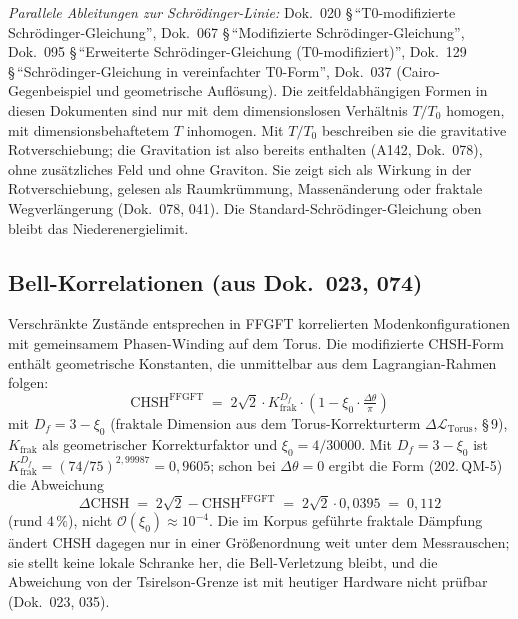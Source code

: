 \textit{Parallele Ableitungen zur Schrödinger-Linie:}
Dok.~020 \S\,\enquote{T0-modifizierte Schrödinger-Gleichung},
Dok.~067 \S\,\enquote{Modifizierte Schrödinger-Gleichung},
Dok.~095 \S\,\enquote{Erweiterte Schrödinger-Gleichung (T0-modifiziert)},
Dok.~129 \S\,\enquote{Schrödinger-Gleichung in vereinfachter T0-Form},
Dok.~037 (Cairo-Gegenbeispiel und geometrische Auflösung).
Die zeitfeldabhängigen Formen in diesen Dokumenten sind nur mit dem dimensionslosen Verhältnis $T/T_0$ homogen, mit dimensionsbehaftetem $T$ inhomogen. Mit $T/T_0$ beschreiben sie die gravitative Rotverschiebung; die Gravitation ist also bereits enthalten (A142, Dok.~078), ohne zusätzliches Feld und ohne Graviton. Sie zeigt sich als Wirkung in der Rotverschiebung, gelesen als Raumkrümmung, Massenänderung oder fraktale Wegverlängerung (Dok.~078, 041). Die Standard-Schrödinger-Gleichung oben bleibt das Niederenergielimit.

\subsection*{Bell-Korrelationen (aus Dok.~023, 074)}

Verschränkte Zustände entsprechen in FFGFT korrelierten
Modenkonfigurationen mit gemeinsamem Phasen-Winding auf dem Torus.
Die modifizierte CHSH-Form enthält geometrische Konstanten, die
unmittelbar aus dem Lagrangian-Rahmen folgen:
\begin{equation}
  \mathrm{CHSH}^{\mathrm{FFGFT}}
  \;=\; 2\sqrt{2}\cdot K_{\text{frak}}^{D_f}\cdot
        \left(1 - \xi_0\cdot\tfrac{\Delta\theta}{\pi}\right)
  \tag{202.\,QM-5}
\end{equation}
mit $D_f = 3 - \xi_0$ (fraktale Dimension aus dem Torus-Korrekturterm
$\Delta\mathcal{L}_{\text{Torus}}$, \S\,9), $K_{\text{frak}}$ als
geometrischer Korrekturfaktor und $\xi_0 = 4/30000$. Mit $D_f = 3 - \xi_0$ ist
$K_{\text{frak}}^{D_f} = (74/75)^{2{,}99987} = 0{,}9605$; schon bei
$\Delta\theta = 0$ ergibt die Form (202.\,QM-5) die Abweichung
\begin{equation}
  \Delta\mathrm{CHSH} \;=\; 2\sqrt{2} - \mathrm{CHSH}^{\mathrm{FFGFT}}
  \;=\; 2\sqrt{2}\cdot 0{,}0395 \;=\; 0{,}112
  \tag{202.\,QM-6}
\end{equation}
(rund $4\,\%$), nicht $\mathcal{O}(\xi_0) \approx 10^{-4}$. Die im
Korpus geführte fraktale Dämpfung ändert CHSH dagegen nur in einer
Größenordnung weit unter dem Messrauschen; sie stellt keine lokale
Schranke her, die Bell-Verletzung bleibt, und die Abweichung von der
Tsirelson-Grenze ist mit heutiger Hardware nicht prüfbar (Dok.~023, 035).


